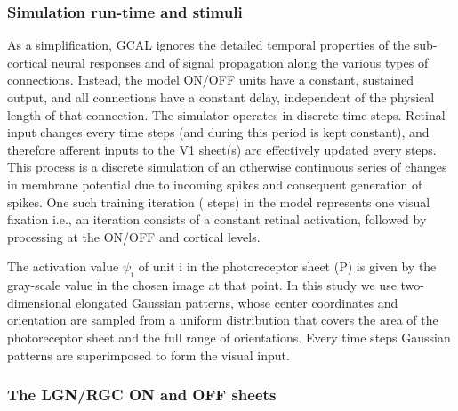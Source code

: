\documentclass[utf8]{frontiersSCNS}
\begin{document}
\subsubsection{Simulation run-time and stimuli}

As a simplification, GCAL ignores the detailed temporal properties of the sub-cortical neural responses and of signal propagation along the various types of connections. Instead, the model ON/OFF units have a constant, sustained output, and all connections have a constant delay, independent of the physical length of that connection. The simulator operates in discrete time steps. Retinal input changes every  time steps (and during this period is kept constant), and therefore afferent inputs to the V1 sheet(s) are effectively updated every  steps. This process is a discrete simulation of an otherwise continuous series of changes in membrane potential due to incoming spikes and consequent generation of spikes. One such training iteration ( steps) in the model represents one visual fixation i.e., an iteration consists of a constant retinal activation, followed by processing at the ON/OFF and cortical levels.

The activation value $\psi_{i}$ of unit i in the photoreceptor sheet (P) is given by the gray-scale value in the chosen image at that point.
In this study we use two-dimensional elongated Gaussian patterns, whose center coordinates and orientation are sampled from a uniform 
distribution that covers the area of the photoreceptor sheet and the full range of orientations. Every  time steps  Gaussian patterns are superimposed to form the visual input.

\subsubsection{The LGN/RGC ON and OFF sheets}
\end{document}
